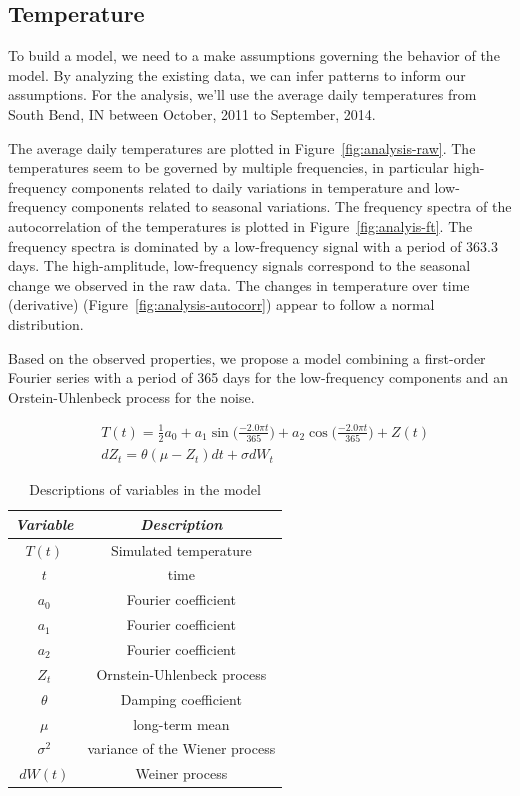 \documentclass[11pt, letterpaper]{article}
\begin{document}
\subsection{Temperature}
To build a model, we need to a make assumptions governing the behavior of the model.  By analyzing the existing data, we can infer patterns to inform our assumptions.  For the analysis, we'll use the average daily temperatures from South Bend, IN between October, 2011 to September, 2014.

The average daily temperatures are plotted in Figure~\ref{fig:analysis-raw}. The temperatures seem to be governed by multiple frequencies, in particular high-frequency components related to daily variations in temperature and low-frequency components related to seasonal variations.   The frequency spectra of the autocorrelation of the temperatures is plotted in Figure~\ref{fig:analyis-ft}.  The frequency spectra is dominated by a low-frequency signal with a period of 363.3 days. The high-amplitude, low-frequency signals correspond to the seasonal change we observed in the raw data.  The changes in temperature over time (derivative) (Figure~\ref{fig:analysis-autocorr}) appear to follow a normal distribution.


Based on the observed properties, we propose a model combining a first-order Fourier series with a period of 365 days for the low-frequency components and an Orstein-Uhlenbeck process for the noise.

\begin{align}
&T(t) = \frac{1}{2} a_0 + a_1 \sin\Big(\frac{-2.0 \pi t}{365}\Big) + a_2 \cos\Big(\frac{-2.0 \pi t}{365}\Big) + Z(t) \\
&dZ_t = \theta (\mu - Z_t)dt + \sigma dW_t
\end{align}

\begin{table}[H]
  \centering
  \begin{tabular}{c c} \hline
  \emph{Variable} & \emph{Description}\\ \hline
  $T(t)$ & Simulated temperature \\ \hline
  $t$ & time \\ \hline
  $a_0$ & Fourier coefficient \\ \hline
  $a_1$ & Fourier coefficient \\ \hline
  $a_2$ & Fourier coefficient \\ \hline
  $Z_t$ & Ornstein-Uhlenbeck process \\ \hline
  $\theta$ & Damping coefficient\\ \hline
  $\mu$ & long-term mean \\ \hline
  $\sigma^2$ & variance of the Wiener process \\ \hline
  $dW(t)$ & Weiner process \\ \hline 
  \end{tabular}
  \caption{Descriptions of variables in the model}
  \label{tab:analysis-ft-values}
\end{table}
\end{document}
